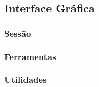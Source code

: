 \subsection{Interface Gráfica}
    \subsubsection{Sessão}
        \begin{frame}\frametitle{}
        \end{frame}
        
    \subsubsection{Ferramentas}
        \begin{frame}\frametitle{}
        \end{frame}
        
            \begin{frame}\frametitle{}
            \end{frame}
            
            \begin{frame}\frametitle{}
            \end{frame}
            
            \begin{frame}\frametitle{}
            \end{frame}
            
    \subsubsection{Utilidades}
        \begin{frame}\frametitle{}
        \end{frame}
            \begin{frame}\frametitle{}
            \end{frame}
            
            \begin{frame}\frametitle{}
            \end{frame}

